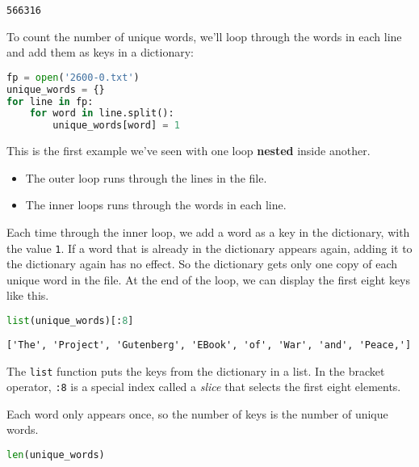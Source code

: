 \begin{lstlisting}[style=output]
566316
\end{lstlisting}

To count the number of unique words, we'll loop through the words in
each line and add them as keys in a dictionary:

\begin{lstlisting}[language=Python,style=source]
fp = open('2600-0.txt')
unique_words = {}
for line in fp:
    for word in line.split():
        unique_words[word] = 1
\end{lstlisting}

This is the first example we've seen with one loop \textbf{nested}
inside another.

\begin{itemize}
\item
  The outer loop runs through the lines in the file.
\item
  The inner loops runs through the words in each line.
\end{itemize}

Each time through the inner loop, we add a word as a key in the
dictionary, with the value \passthrough{\lstinline!1!}. If a word that
is already in the dictionary appears again, adding it to the dictionary
again has no effect. So the dictionary gets only one copy of each unique
word in the file. At the end of the loop, we can display the first eight
keys like this.

\begin{lstlisting}[language=Python,style=source]
list(unique_words)[:8]
\end{lstlisting}

\begin{lstlisting}[style=output]
['The', 'Project', 'Gutenberg', 'EBook', 'of', 'War', 'and', 'Peace,']
\end{lstlisting}

The \passthrough{\lstinline!list!} function puts the keys from the
dictionary in a list. In the bracket operator,
\passthrough{\lstinline!:8!} is a special index called a \emph{slice}
that selects the first eight elements.

Each word only appears once, so the number of keys is the number of
unique words.

\begin{lstlisting}[language=Python,style=source]
len(unique_words)
\end{lstlisting}

